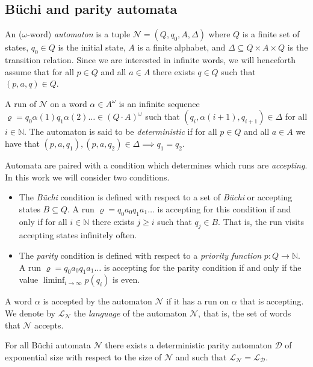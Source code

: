 \documentclass[runningheads,a4paper,draft]{llncs}
\let\rho\varrho
\newcommand{\calN}{\mathcal{N}}
\newcommand{\calD}{\mathcal{D}}
\newcommand{\lang}[1]{\mathcal{L}_{#1}}
\begin{document}
\subsection{B\"uchi and parity automata}
\begin{definition}
  An ($\omega$-word) \emph{automaton} is a tuple $\calN =
  (Q,q_0,A,\Delta)$ where $Q$ is a finite set of states, $q_0 \in Q$ is the
  initial state, $A$ is a finite alphabet, and $\Delta \subseteq Q \times A
  \times Q$ is the transition relation. Since we are interested in infinite
  words, we will henceforth assume that for all $p \in Q$ and all $a \in A$
  there exists $q \in Q$ such that $(p,a,q) \in Q$.
\end{definition}
A run of $\calN$ on a word $\alpha \in A^\omega$ is an infinite sequence $\rho =
q_0 \alpha(1) q_1 \alpha(2) \dots \in (Q\cdot A)^\omega$ such that
$(q_i,\alpha(i+1),q_{i+1}) \in \Delta$ for all $i \in \mathbb{N}$. The automaton
is said to be \emph{deterministic} if for all $p \in Q$ and all $a \in A$ we
have that $(p,a,q_1), (p,a,q_2) \in \Delta \implies q_1 = q_2$.

Automata are paired with a condition which determines which runs are
\emph{accepting}. In this work we will consider two conditions.
\begin{itemize}
  \item The \emph{B\"uchi} condition is defined with respect to a set of
    \emph{B\"uchi} or accepting states $B \subseteq Q$. A run $\rho = q_0
    a_0 q_1 a_1 \dots$ is accepting for this condition if and only if for
    all $i \in \mathbb{N}$ there exists $j \ge i$ such that $q_j \in B$.
    That is, the run visits accepting states infinitely often.
  \item The \emph{parity} condition is defined with respect to a
    \emph{priority function} $p : Q \to \mathbb{N}$. A run $\rho = q_0 a_0
    q_1 a_1 \dots$ is accepting for the parity condition if and only if the
    value $\liminf_{i \to \infty} p(q_i)$ is even.
\end{itemize}
A word $\alpha$ is accepted by the automaton $\calN$ if it has a run on
$\alpha$ that is accepting.  We denote by $\lang{\calN}$ the \emph{language} of
the automaton $\calN$, that is, the set of words that $\calN$ accepts.

\begin{proposition}
  For all B\"uchi automata $\calN$ there exists a deterministic parity
  automaton $\calD$ of exponential size with respect to the size of $\calN$
  and such that $\lang{\calN} = \lang{\calD}$.
\end{proposition}
\end{document}
